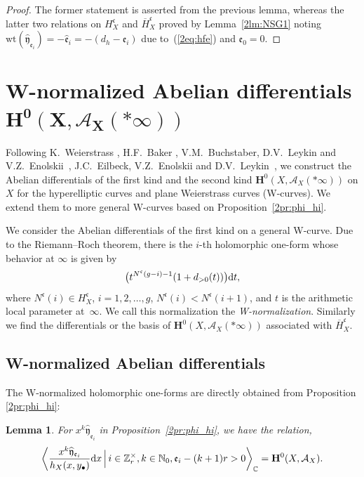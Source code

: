 \documentclass[pdftex]{sigma}
\def\CC{{\mathbb C}}
\def\ZZ{{\mathbb Z}}
\def\NN{{\mathbb N}}
\def\bH{{\mathbf F}}
\def\bH{{\mathbf H}}
\def\cA{{\mathcal A}}
\def\fc{{\mathfrak c}}
\def\fe{{\mathfrak e}}
\def\BH{{\overline H}}
\def\hfe{{\widehat{\mathfrak e}}}
\def\hfy{{\widehat{\mathfrak y}}}
\def\wt{{\mathrm {wt}}}
\numberwithin{equation}{section}
\newtheorem{Lemma}[Theorem]{Lemma}
\begin{document}
\begin{proof}The former statement is asserted from the previous lemma, whereas the latter two relations on $H_X^\fc$ and $\BH_X^\fc$ proved by Lemma~\ref{2lm:NSG1} noting $\wt(\hfy_{\fe_i})=-\hfe_i=-(d_h-\fe_i)$ due to~(\ref{2eq:hfe}) and $\fe_0 =0$.
\end{proof}

\section[W-normalized Abelian differentials H\^{}0(X,A\_X(*infty))]{W-normalized Abelian differentials $\boldsymbol{\bH^0(X, \cA_X(*\infty))}$}\label{2ssc:W-norm_nuI}

Following K.~Weierstrass \cite{WeiWIV},
H.F.~Baker \cite{Baker97}, V.M.~Buchstaber, D.V.~Leykin and V.Z.~Enolskii~\cite{BEL20}, J.C.~Eilbeck, V.Z.~Enolskii and D.V.~Leykin~\cite{EEL00}, we construct the Abelian differentials of the first kind and the second kind $\bH^0(X, \cA_X(*\infty))$ on $X$ for the hyperelliptic curves and plane Weierstrass curves (W-curves).
We extend them to more general W-curves based on Proposition~\ref{2pr:phi_hi}.

We consider the Abelian differentials of the first kind on a general W-curve.
Due to the Riemann--Roch theorem, there is the $i$-th holomorphic one-form
whose behavior at $\infty$ is given by
\begin{equation*}
 \bigr(t^{N^\fc(g-i)-1} (1+ d_{>0}(t))\bigr) {\rm d} t,%
\end{equation*}
where $N^\fc(i) \in H_X^\fc$, $i=1, 2, \dots, g$, $N^\fc(i) <N^\fc(i+1)$, and $t$ is the arithmetic local parameter at~$\infty$.
We call this normalization the {\emph{W-normalization}}.
Similarly we find the differentials or the basis of $\bH^0(X, \cA_X(*\infty))$ associated with $\BH_X^\fc$.

\subsection{W-normalized Abelian differentials}

The W-normalized holomorphic one-forms are directly obtained from Proposition \ref{2pr:phi_hi}:
\begin{Lemma}\label{2lm:hphi_hi}
For $x^k \hfy_{\fe_i}$ in Proposition~{\rm \ref{2pr:phi_hi}}, we have the relation,
\[
\left\langle\frac{x^k\hfy_{\fe_i}}{h_X(x,y_\bullet)}{\rm d} x \, \Bigr|
\, i \in \ZZ_r^\times, k\in \NN_0, \fe_{i}-(k+1)r>0 \right\rangle_\CC
= \bH^0(X, \cA_X).
\]
\end{Lemma}
\end{document}
